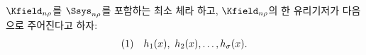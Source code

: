 
$\Kfield_{n\rho}$를 $\Ssys_{n\rho}$를 포함하는 최소 체라 하고, $\Kfield_{n\rho}$의 한 유리기저가 다음으로 주어진다고 하자:
\[
\begin{array}{@{}l@{\quad}c@{}}
(1)&h_1(x),\ h_2(x),\ldots,h_\sigma(x).
\end{array}
\]
